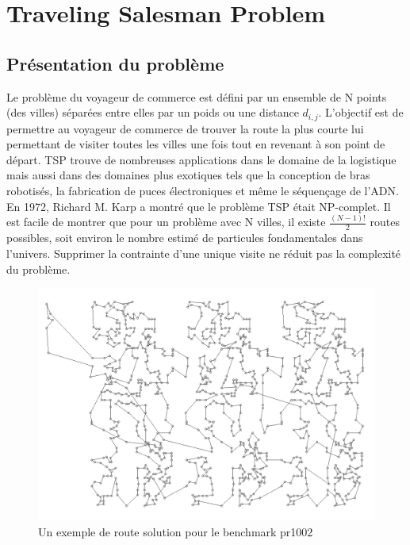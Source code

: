\documentclass{article}%
\begin{document}
\clearpage


\section{Traveling Salesman Problem}

\subsection{Présentation du problème}

Le problème du voyageur de commerce est défini par un ensemble de N points (des villes) séparées entre elles par un poids ou une distance $ d_{i,j} $.
L'objectif est de permettre au voyageur de commerce de trouver la route la plus courte lui permettant de visiter toutes les villes une fois tout en revenant à son point de départ. TSP trouve de nombreuses applications dans le domaine de la logistique mais aussi dans des domaines plus exotiques tels que la conception de bras robotisés, la fabrication de puces électroniques et même le séquençage de l'ADN.
	En 1972, Richard M. Karp a montré que le problème TSP était NP-complet. Il est facile de montrer que pour un problème avec N villes, il existe $ \frac{(N-1)!}{2} $ routes possibles, soit environ le nombre estimé de particules fondamentales dans l'univers. Supprimer la contrainte d'une unique visite ne réduit pas la complexité du problème. 

\begin{figure}[h]
\begin{center}
\includegraphics[scale=0.4]{pr1002.png} 
\caption{Un exemple de route solution pour le benchmark pr1002}
\end{center}
\end{figure}
\end{document}
